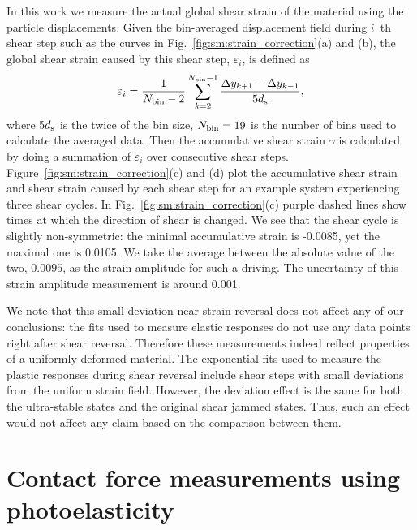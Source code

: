 \documentclass[twocolumn,showkeys,superscriptaddress,preprintnumbers,amsmath,amssymb,showpacs,prx,longbibliography]{revtex4-2}
\begin{document}
In this work we measure the actual global shear strain of the material using the particle displacements. Given the bin-averaged displacement field during $i$~th shear step such as the curves in Fig.~\ref{fig:sm:strain_correction}(a) and (b), the global shear strain caused by this shear step, $\varepsilon_i$, is defined as 
\begin{equation}\label{eq:def_strain_correction}
    \varepsilon_i = \frac{1}{N_{\rm bin}-2}\sum_{k=2}^{N_{\rm bin}-1}\frac{\Delta y_{k+1}-\Delta y _{k-1}}{5d_{\rm s}},
\end{equation}
where $5d_{\rm s}$ is the twice of the bin size, $N_{\rm bin} = 19$ is the number of bins used to calculate the averaged data. Then the accumulative shear strain $\gamma$ is calculated by doing a summation of $\varepsilon_i$ over consecutive shear steps. Figure~\ref{fig:sm:strain_correction}(c) and (d) plot the accumulative shear strain and shear strain caused by each shear step for an example system experiencing three shear cycles. In Fig.~\ref{fig:sm:strain_correction}(c) purple dashed lines show times at which the direction of shear is changed. We see that the shear cycle is slightly non-symmetric: the minimal accumulative strain is -0.0085, yet the maximal one is 0.0105. We take the average between the absolute value of the two, $0.0095$, as the strain amplitude for such a driving. The uncertainty of this strain amplitude measurement is around 0.001.

We note that this small deviation near strain reversal does not affect any of our conclusions: the fits used to measure elastic responses do not use any data points right after shear reversal. Therefore these measurements indeed reflect properties of a uniformly deformed material. The exponential fits used to measure the plastic responses during shear reversal include shear steps with small deviations from the uniform strain field. However, the deviation effect is the same for both the ultra-stable states and the original shear jammed states. Thus, such an effect would not affect any claim based on the comparison between them.

\section{Contact force measurements using photoelasticity} \label{sec_force_uncertainty}
\end{document}
